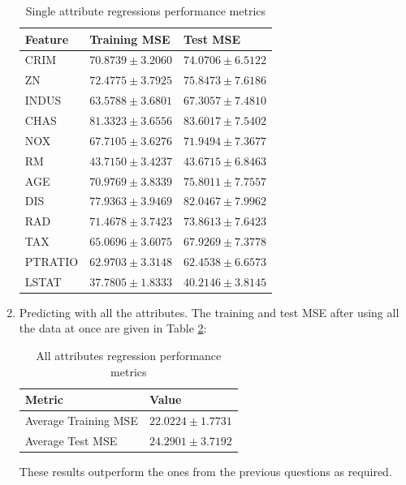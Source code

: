 \documentclass[final,3p,times,12pt]{article}
\begin{document}
\begin{enumerate}
    \begin{table}[H]
        \centering
        \begin{tabular}{lll}
            \toprule
            \textbf{Feature} & \textbf{Training MSE} & \textbf{Test MSE} \\
            \midrule
            CRIM      & $70.8739 \pm 3.2060$ & $74.0706 \pm 6.5122$ \\
            ZN        & $72.4775 \pm 3.7925$ & $75.8473 \pm 7.6186$ \\
            INDUS     & $63.5788 \pm 3.6801$ & $67.3057 \pm 7.4810$ \\
            CHAS      & $81.3323 \pm 3.6556$ & $83.6017 \pm 7.5402$ \\
            NOX       & $67.7105 \pm 3.6276$ & $71.9494 \pm 7.3677$ \\
            RM        & $43.7150 \pm 3.4237$ & $43.6715 \pm 6.8463$ \\
            AGE       & $70.9769 \pm 3.8339$ & $75.8011 \pm 7.7557$ \\
            DIS       & $77.9363 \pm 3.9469$ & $82.0467 \pm 7.9962$ \\
            RAD       & $71.4678 \pm 3.7423$ & $73.8613 \pm 7.6423$ \\
            TAX       & $65.0696 \pm 3.6075$ & $67.9269 \pm 7.3778$ \\
            PTRATIO   & $62.9703 \pm 3.3148$ & $62.4538 \pm 6.6573$ \\
            LSTAT     & $37.7805 \pm 1.8333$ & $40.2146 \pm 3.8145$ \\
            \bottomrule
        \end{tabular}
        \caption{Single attribute regressions performance metrics}
        \label{tab:question_4c}
    \end{table}
    
    \item Predicting with all the attributes. The training and test MSE after using all the data at once are given in Table \ref{tab:question_4d}:

    \begin{table}[H]
        \centering
        \begin{tabular}{ll}
            \toprule
            \textbf{Metric} & \textbf{Value} \\
            \midrule
            Average Training MSE & $22.0224 \pm 1.7731$ \\
            Average Test MSE & $24.2901 \pm 3.7192$ \\
            \bottomrule
        \end{tabular}
        \caption{All attributes regression performance metrics}
        \label{tab:question_4d}
    \end{table}

    These results outperform the ones from the previous questions as required. 
\end{enumerate}
\end{document}
